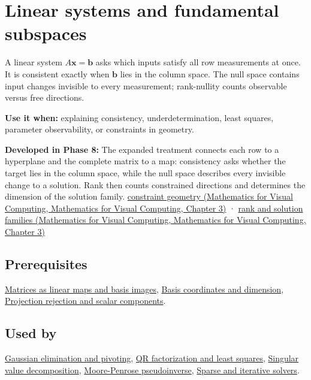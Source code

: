 \hypertarget{appendix-8572a4a060c1}{}\label{referencestart:appendix-8572a4a060c1}
\section{Linear systems and fundamental subspaces}\label{appendix-8572a4a060c1-linear-systems-and-fundamental-subspaces}

A linear system \(A\mathbf x=\mathbf b\) asks which inputs satisfy all row measurements at once. It is consistent exactly when \(\mathbf b\) lies in the column space. The null space contains input changes invisible to every measurement; rank-nullity counts observable versus free directions.

\textbf{Use it when:} explaining consistency, underdetermination, least squares, parameter observability, or constraints in geometry.

\textbf{Developed in Phase 8:} The expanded treatment connects each row to a hyperplane and the complete matrix to a map: consistency asks whether the target lies in the column space, while the null space describes every invisible change to a solution. Rank then counts constrained directions and determines the dimension of the solution family. \href{../02-Mathematics-for-Visual-Computing/main.pdf\#nameddest=01-foundations-i-ch019-a-system-is-an-intersection-of-constraints}{constraint geometry (Mathematics for Visual Computing, Mathematics for Visual Computing, Chapter 3)} · \href{../02-Mathematics-for-Visual-Computing/main.pdf\#nameddest=01-foundations-i-ch019-rank-the-four-spaces-and-the-shape-of-the-answer}{rank and solution families (Mathematics for Visual Computing, Mathematics for Visual Computing, Chapter 3)}

\subsection{Prerequisites}\label{appendix-8572a4a060c1-prerequisites}

\hyperref[appendix-bd39c3bf5d64]{Matrices as linear maps and basis images}, \hyperref[appendix-ce0341f7ea0d]{Basis coordinates and dimension}, \hyperref[appendix-505a502c372a]{Projection rejection and scalar components}.

\subsection{Used by}\label{appendix-8572a4a060c1-used-by}

\hyperref[appendix-f6e77f4a200f]{Gaussian elimination and pivoting}, \hyperref[appendix-c3421e6b4f2c]{QR factorization and least squares}, \hyperref[appendix-1fad5e7f36fa]{Singular value decomposition}, \hyperref[appendix-541306fdbc1b]{Moore-Penrose pseudoinverse}, \hyperref[appendix-67c87a3d9e94]{Sparse and iterative solvers}.

